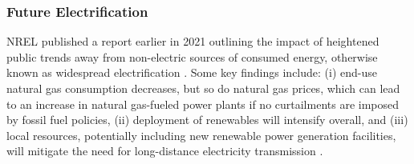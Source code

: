 \subsubsection{Future Electrification}\label{ch4:electrification_uncertainty}

NREL published a report earlier in 2021 outlining the impact of heightened public trends away from non-electric sources of consumed energy, otherwise known as widespread electrification \citep{murphy_electrification_2021}. Some key findings include: (i) end-use natural gas consumption decreases, but so do natural gas prices, which can lead to an increase in natural gas-fueled power plants if no curtailments are imposed by fossil fuel policies, (ii) deployment of renewables will intensify overall, and (iii) local resources, potentially including new renewable power generation facilities, will mitigate the need for long-distance electricity transmission \citep{murphy_electrification_2021}.

